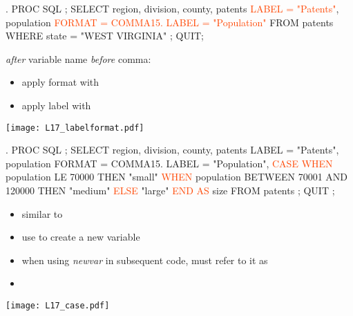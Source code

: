 \begin{frame}[fragile]
\hspace*{-0.3in}
\begin{code}{.}
PROC SQL ;
   SELECT region, division, county,
      patents \textcolor{OrangeRed}{LABEL = "Patents"},
      population \textcolor{OrangeRed}{FORMAT = COMMA15. LABEL = "Population"}
   FROM patents
   WHERE state = "WEST VIRGINIA"
   ;
QUIT;
\end{code}
\emp
\vskip5pt
\hspace*{-0.3in}
\emph{after} variable name \emph{before} comma:
\begin{itemize}
\item apply format with 
\item apply label with  
\end{itemize}
\emp
{}
\texttt{[image: L17\_labelformat.pdf]}
\emp
\end{frame}

\begin{frame}[fragile]
\begin{code}{.}
PROC SQL ;
   SELECT region, division, county, patents LABEL = "Patents",
   population FORMAT = COMMA15. LABEL = "Population",
   \textcolor{OrangeRed}{CASE}
      \textcolor{OrangeRed}{WHEN} population LE 70000 THEN "small"
      \textcolor{OrangeRed}{WHEN} population BETWEEN 70001 AND 120000 THEN "medium"
      \textcolor{OrangeRed}{ELSE} "large"
   \textcolor{OrangeRed}{END AS} size
   FROM patents ;
QUIT ;
\end{code}
\emp
\vskip5pt
\begin{itemize}
\item {} similar to 
\item use  to create a new variable
\item when using \emph{newvar} in subsequent code, must refer to it as
\item[]
\end{itemize}
\end{frame}

\begin{frame}[fragile]
\texttt{[image: L17\_case.pdf]}
\end{frame}


